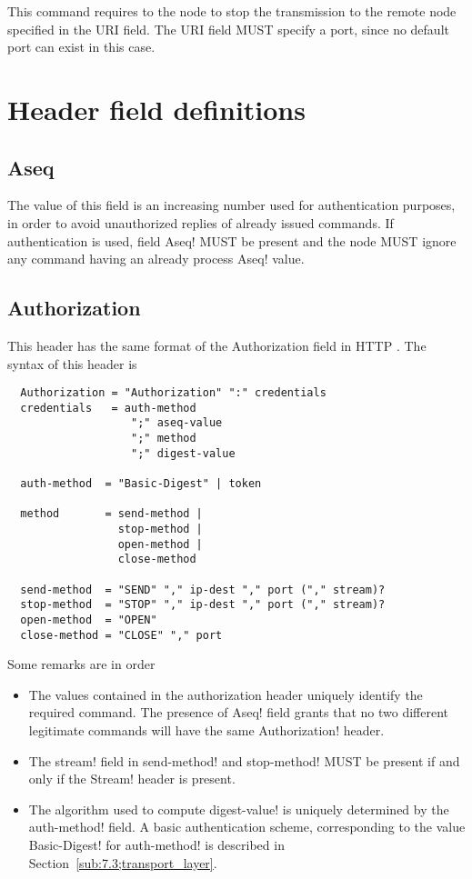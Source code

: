 \documentclass{rfc}
\begin{document}
This command requires to the node to stop the transmission to the
remote node specified in the URI field.  The URI field MUST specify a
port, since no default port can exist in this case.


\section{Header field definitions}
\label{sub:7.1;transport_layer}

\subsection{Aseq}
\label{subsub:7.1.3;transport_layer}

The value of this field is an increasing number used for
authentication purposes, in order to avoid unauthorized replies of
already issued commands.  If authentication is used, field \ttt Aseq!
MUST be present and the node MUST ignore any command having an already
process \ttt Aseq! value.

\subsection{Authorization}
\label{subsub:7.1.0;transport_layer}

This header has the same format of the Authorization field in HTTP
\cite[Section~14.8]{rfc2616}.  The syntax of this header is

\begin{verbatim}
  Authorization = "Authorization" ":" credentials
  credentials   = auth-method 
                   ";" aseq-value 
                   ";" method 
                   ";" digest-value

  auth-method  = "Basic-Digest" | token

  method       = send-method |
                 stop-method |
                 open-method |
                 close-method

  send-method  = "SEND" "," ip-dest "," port ("," stream)?
  stop-method  = "STOP" "," ip-dest "," port ("," stream)?
  open-method  = "OPEN"
  close-method = "CLOSE" "," port
\end{verbatim}

Some remarks are in order

\begin{itemize}
  \item
    The values contained in the authorization header uniquely identify
    the required command.  The presence of \ttt Aseq! field grants
    that no two different legitimate commands will have the same \ttt
    Authorization! header.
  \item
    The \ttt stream! field in \ttt send-method! and  \ttt stop-method!
    MUST be present if and only if the \ttt Stream! header is present.
  \item
    The algorithm used to compute \ttt digest-value! is uniquely
    determined by the \ttt auth-method! field.  A basic authentication
    scheme, corresponding to the value \ttt Basic-Digest! for \ttt
    auth-method! is described in Section~\ref{sub:7.3;transport_layer}.
\end{itemize}
\end{document}
